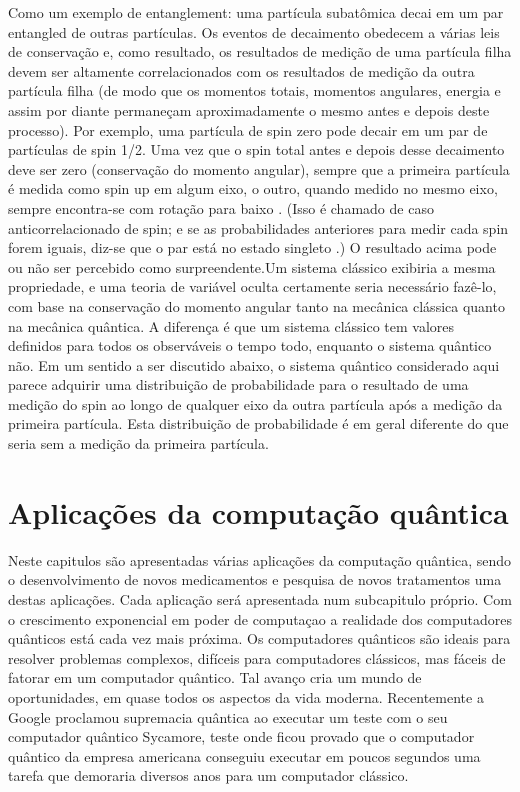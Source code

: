 \documentclass{report}
\begin{document}
Como um exemplo de entanglement: uma partícula subatômica decai em um par entangled de outras partículas. Os eventos de decaimento obedecem a várias leis de conservação e, como resultado, os resultados de medição de uma partícula filha devem ser altamente correlacionados com os resultados de medição da outra partícula filha (de modo que os momentos totais, momentos angulares, energia e assim por diante permaneçam aproximadamente o mesmo antes e depois deste processo). Por exemplo, uma partícula de spin zero pode decair em um par de partículas de spin 1/2. Uma vez que o spin total antes e depois desse decaimento deve ser zero (conservação do momento angular), sempre que a primeira partícula é medida como spin up em algum eixo, o outro, quando medido no mesmo eixo, sempre encontra-se com rotação para baixo . (Isso é chamado de caso anticorrelacionado de spin; e se as probabilidades anteriores para medir cada spin forem iguais, diz-se que o par está no estado singleto .)
\newline
O resultado acima pode ou não ser percebido como surpreendente.Um sistema clássico exibiria a mesma propriedade, e uma teoria de variável oculta certamente seria necessário fazê-lo, com base na conservação do momento angular tanto na mecânica clássica quanto na mecânica quântica. A diferença é que um sistema clássico tem valores definidos para todos os observáveis o tempo todo, enquanto o sistema quântico não. Em um sentido a ser discutido abaixo, o sistema quântico considerado aqui parece adquirir uma distribuição de probabilidade para o resultado de uma medição do spin ao longo de qualquer eixo da outra partícula após a medição da primeira partícula. Esta distribuição de probabilidade é em geral diferente do que seria sem a medição da primeira partícula.


\chapter{Aplicações da computação quântica}
\label{chap.aplicacoes}
Neste capitulos são apresentadas várias aplicações da computação quântica, sendo o desenvolvimento de novos medicamentos e pesquisa de novos tratamentos uma destas aplicações. Cada aplicação será apresentada num subcapitulo próprio.
Com o crescimento exponencial em poder de computaçao a realidade dos computadores quânticos está cada vez mais próxima. Os computadores quânticos  são ideais para resolver problemas complexos, difíceis para computadores clássicos, mas fáceis de fatorar em um computador quântico. Tal avanço cria um mundo de oportunidades, em quase todos os aspectos da vida moderna.
Recentemente a Google proclamou supremacia quântica ao executar um teste com o seu computador quântico Sycamore, teste onde ficou provado que o computador quântico da empresa americana conseguiu executar em poucos segundos uma tarefa que demoraria diversos anos para um computador clássico.
\end{document}
